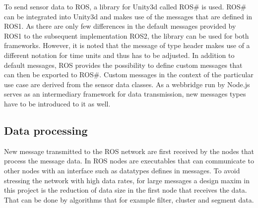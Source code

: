 To send sensor data to \ac{ROS}, a library for Unity3d called ROS\# is used. ROS\# can be integrated into Unity3d and makes use of the messages that are defined in \ac{ROS}1. As there are only few differences in the default messages provided by \ac{ROS}1 to the subsequent implementation \ac{ROS}2, the library can be used for both frameworks. However, it is noted that the message of type header makes use of a different notation for time units and thus has to be adjusted. In addition to default messages, \ac{ROS} provides the possibility to define custom messages that can then be exported to ROS\#. Custom messages in the context of the particular use case are derived from the sensor data classes. As a webbridge run by Node.js serves as an intermediary framework for data transmission, new messages types have to be introduced to it as well.\\

\subsection{Data processing} \label{DataProcessing}

New message transmitted to the \ac{ROS} network are first received by the nodes that process the message data. In \ac{ROS} nodes are executables that can communicate to other nodes with an interface such as datatypes defines in messages. To avoid stressing the network with high data rates, for large messages a design maxim in this project is the reduction of data size in the first node that receives the data. That can be done by algorithms that for example filter, cluster and segment data. \\

